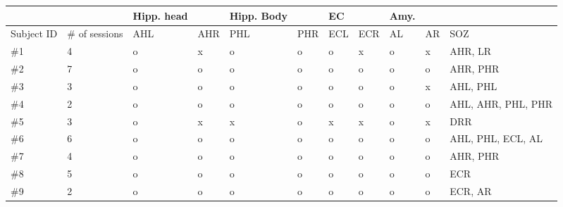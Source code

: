 \documentclass[a4paper]{article}
\begin{document}
\begin{tabular}{|l|l|l|l|l|l|l|l|l|l|l|}
\hline
&&Hipp. head&&Hipp. Body&&EC&&Amy.&&
\\
\hline
Subject ID&\# of sessions&AHL&AHR&PHL&PHR&ECL&ECR&AL&AR&SOZ
\\
\hline
\#1&4&o&x&o&o&o&x&o&x&AHR, LR
\\
\hline
\#2&7&o&o&o&o&o&o&o&o&AHR, PHR
\\
\hline
\#3&3&o&o&o&o&o&o&o&x&AHL, PHL
\\
\hline
\#4&2&o&o&o&o&o&o&o&o&AHL, AHR, PHL, PHR
\\
\hline
\#5&3&o&x&x&o&x&x&o&x&DRR
\\
\hline
\#6&6&o&o&o&o&o&o&o&o&AHL, PHL, ECL, AL
\\
\hline
\#7&4&o&o&o&o&o&o&o&o&AHR, PHR
\\
\hline
\#8&5&o&o&o&o&o&o&o&o&ECR
\\
\hline
\#9&2&o&o&o&o&o&o&o&o&ECR, AR
\\
\hline
\end{tabular}
\end{document}
